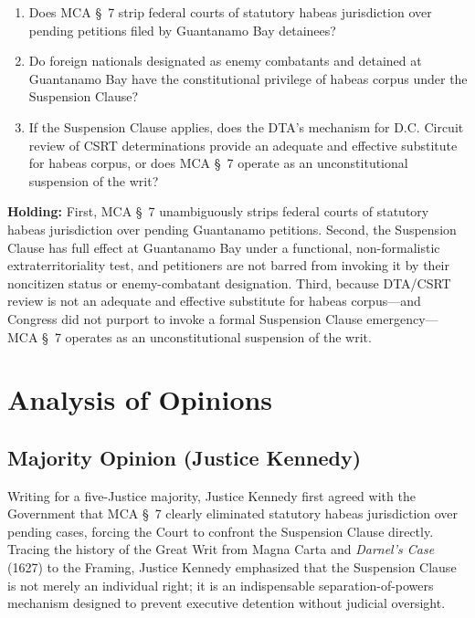 \documentclass[12pt]{article}
\begin{document}
\begin{enumerate}
  \item Does MCA \S~7 strip federal courts of statutory habeas jurisdiction over pending petitions filed by Guantanamo Bay detainees?
  \item Do foreign nationals designated as enemy combatants and detained at Guantanamo Bay have the constitutional privilege of habeas corpus under the Suspension Clause?
  \item If the Suspension Clause applies, does the DTA's mechanism for D.C. Circuit review of CSRT determinations provide an adequate and effective substitute for habeas corpus, or does MCA \S~7 operate as an unconstitutional suspension of the writ?
\end{enumerate}

\textbf{Holding:} First, MCA \S~7 unambiguously strips federal courts of statutory habeas jurisdiction over pending Guantanamo petitions. Second, the Suspension Clause has full effect at Guantanamo Bay under a functional, non-formalistic extraterritoriality test, and petitioners are not barred from invoking it by their noncitizen status or enemy-combatant designation. Third, because DTA/CSRT review is not an adequate and effective substitute for habeas corpus---and Congress did not purport to invoke a formal Suspension Clause emergency---MCA \S~7 operates as an unconstitutional suspension of the writ.

\section{Analysis of Opinions}
\subsection{Majority Opinion (Justice Kennedy)}

Writing for a five-Justice majority, Justice Kennedy first agreed with the Government that MCA \S~7 clearly eliminated statutory habeas jurisdiction over pending cases, forcing the Court to confront the Suspension Clause directly. Tracing the history of the Great Writ from Magna Carta and \textit{Darnel's Case} (1627) to the Framing, Justice Kennedy emphasized that the Suspension Clause is not merely an individual right; it is an indispensable separation-of-powers mechanism designed to prevent executive detention without judicial oversight.
\end{document}

